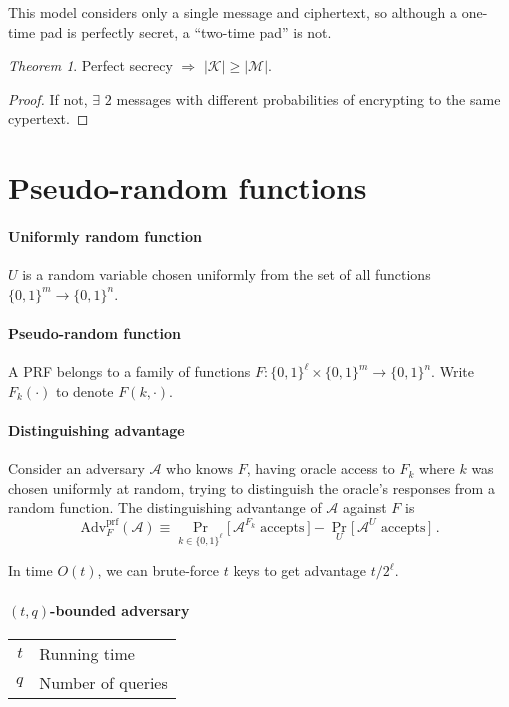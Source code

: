 \documentclass[11pt]{article}
\newcommand{\eqdef}{\ensuremath{\equiv}}
\theoremstyle{remark}
\newtheorem{thm}{Theorem}
\begin{document}
This model considers only a single message and ciphertext,
so although a one-time pad is perfectly secret, a ``two-time pad'' is not.

\begin{thm}
Perfect secrecy $\Rightarrow$ $|\mathcal{K}| \ge |\mathcal{M}|$.
\begin{proof}
If not, $\exists$ $2$ messages with different probabilities
of encrypting to the same cypertext.
\end{proof}
\end{thm}

\section{Pseudo-random functions}

\paragraph{Uniformly random function}
$U$ is a random variable chosen uniformly from the set of all functions
$\{0,1\}^m \rightarrow \{0,1\}^n$.

\paragraph{Pseudo-random function}
A PRF belongs to a family of functions
$F : \{0,1\}^\ell \times \{0,1\}^m \rightarrow \{0,1\}^n$.
Write $F_k(\cdot)$ to denote $F(k, \cdot)$.

\paragraph{Distinguishing advantage}
Consider an adversary $\mathcal{A}$ who knows $F$, having oracle access
to $F_k$ where $k$ was chosen uniformly at random, trying to
distinguish the oracle's responses from a random function.
The distinguishing advantange of $\mathcal{A}$ against $F$ is
\[ \textrm{Adv}_F^\textrm{prf}(\mathcal{A}) \eqdef
\Pr_{k\in\{0,1\}^\ell} \big[\, \mathcal{A}^{F_k}\;\textrm{accepts} \,\big]
- \Pr_U \big[\, \mathcal{A}^U \textrm{ accepts} \,\big] \;\textrm{.} \]

In time $O(t)$, we can brute-force $t$ keys to get
advantage $t / 2^\ell$.

\paragraph{$(t,q)$-bounded adversary}
\begin{tabular}{r|l}
$t$ & Running time \\
$q$ & Number of queries
\end{tabular}
\end{document}
